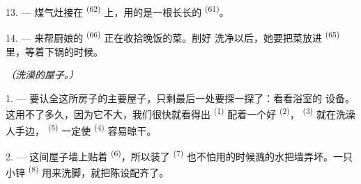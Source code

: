 13. --- 煤气灶接在 \textsuperscript{(62)} 上，用的是一根长长的
 \textsuperscript{(61)}。

14. --- 来帮厨娘的 \textsuperscript{(66)} 正在收拾晚饭的菜。削好
洗净以后，她要把菜放进 \textsuperscript{(65)} 里，等着下锅的时候。

\VUsaut{4.0mm}
{\centering\fontsize{10.2pt}{10.2pt}\selectfont{} \textit{（洗澡的屋子。）}\par}
\VUsaut{3.0mm}

1. --- 要认全这所房子的主要屋子，只剩最后一处要探一探了：看看浴室的
设备。这用不了多久，因为它不大，我们很快就看得出
\textsuperscript{(1)} 配着一个好 \textsuperscript{(2)}，
\textsuperscript{(3)} 就在洗澡人手边， \textsuperscript{(5)} 一定使
 \textsuperscript{(4)} 容易晾干。

2. --- 这间屋子墙上贴着 \textsuperscript{(6)}，所以装了
 \textsuperscript{(7)} 也不怕用的时候溅的水把墙弄坏。一只小锌
 \textsuperscript{(8)} 用来洗脚，就把陈设配齐了。
\VUsaut{6.0mm}
\VUfilet{22mm}
